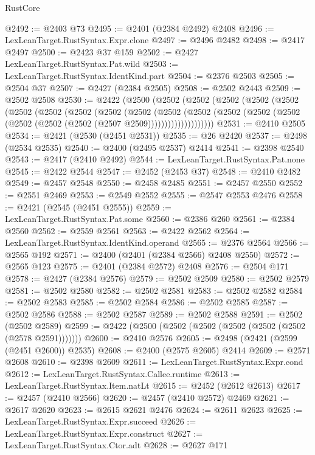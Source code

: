 \begin{lexlean}{RustCore}
\begin{coremodule}
@2492 := @2403 @73
@2495 := @2401 (@2384 @2492) @2408
@2496 := LexLeanTarget.RustSyntax.Expr.clone
@2497 := @2496 @2482
@2498 := @2417 @2497
@2500 := @2423 @37 @159
@2502 := @2427 LexLeanTarget.RustSyntax.Pat.wild
@2503 := LexLeanTarget.RustSyntax.IdentKind.part
@2504 := @2376 @2503
@2505 := @2504 @37
@2507 := @2427 (@2384 @2505)
@2508 := @2502 @2443
@2509 := @2502 @2508
@2530 := @2422
    (@2500
      (@2502
        (@2502
          (@2502
            (@2502
              (@2502
                (@2502
                  (@2502
                    (@2502
                      (@2502
                        (@2502
                          (@2502
                            (@2502
                              (@2502
                                (@2502 (@2502 (@2502 (@2502 (@2502 (@2507 @2509))))))))))))))))))))
@2531 := @2410 @2505
@2534 := @2421 (@2530 (@2451 @2531))
@2535 := @26 @2420
@2537 := @2498 (@2534 @2535)
@2540 := @2400 (@2495 @2537) @2414
@2541 := @2398 @2540
@2543 := @2417 (@2410 @2492)
@2544 := LexLeanTarget.RustSyntax.Pat.none
@2545 := @2422 @2544
@2547 := @2452 (@2453 @37)
@2548 := @2410 @2482
@2549 := @2457 @2548
@2550 := @2458 @2485
@2551 := @2457 @2550
@2552 := @2551 @2469
@2553 := @2549 @2552
@2555 := @2547 @2553 @2476
@2558 := @2421 (@2545 (@2451 @2555))
@2559 := LexLeanTarget.RustSyntax.Pat.some
@2560 := @2386 @260
@2561 := @2384 @2560
@2562 := @2559 @2561
@2563 := @2422 @2562
@2564 := LexLeanTarget.RustSyntax.IdentKind.operand
@2565 := @2376 @2564
@2566 := @2565 @192
@2571 := @2400 (@2401 (@2384 @2566) @2408 @2550)
@2572 := @2565 @123
@2575 := @2401 (@2384 @2572) @2408
@2576 := @2504 @171
@2578 := @2427 (@2384 @2576)
@2579 := @2502 @2509
@2580 := @2502 @2579
@2581 := @2502 @2580
@2582 := @2502 @2581
@2583 := @2502 @2582
@2584 := @2502 @2583
@2585 := @2502 @2584
@2586 := @2502 @2585
@2587 := @2502 @2586
@2588 := @2502 @2587
@2589 := @2502 @2588
@2591 := @2502 (@2502 @2589)
@2599 := @2422 (@2500 (@2502 (@2502 (@2502 (@2502 (@2502 (@2578 @2591)))))))
@2600 := @2410 @2576
@2605 := @2498 (@2421 (@2599 (@2451 @2600)) @2535)
@2608 := @2400 (@2575 @2605) @2414
@2609 := @2571 @2608
@2610 := @2398 @2609
@2611 := LexLeanTarget.RustSyntax.Expr.cond
@2612 := LexLeanTarget.RustSyntax.Callee.runtime
@2613 := LexLeanTarget.RustSyntax.Item.natLt
@2615 := @2452 (@2612 @2613)
@2617 := @2457 (@2410 @2566)
@2620 := @2457 (@2410 @2572) @2469
@2621 := @2617 @2620
@2623 := @2615 @2621 @2476
@2624 := @2611 @2623
@2625 := LexLeanTarget.RustSyntax.Expr.succeed
@2626 := LexLeanTarget.RustSyntax.Expr.construct
@2627 := LexLeanTarget.RustSyntax.Ctor.adt
@2628 := @2627 @171

\end{coremodule}
\end{lexlean}
